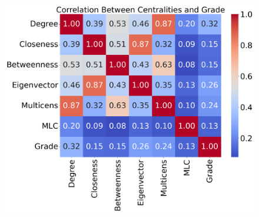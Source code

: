 \documentclass[10pt,letterpaper]{article}
\begin{document}
\begin{figure}[h!]
\begin{minipage}[b]{0.28\linewidth}
	\centering
	\includegraphics[width=\textwidth]{figs/fig33-npas1_arnt-corr.png}
	\subcaption{}
\end{minipage}

\vspace{0.5cm}


\end{figure}
\end{document}
